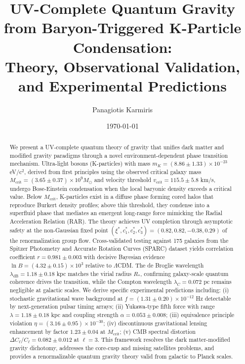 \documentclass[aps,prd,twocolumn,showpacs,superscriptaddress,groupedaddress,nofootinbib]{revtex4-2}
\begin{document}
\title{UV-Complete Quantum Gravity from Baryon-Triggered K-Particle Condensation: \\
Theory, Observational Validation, and Experimental Predictions}

\author{Panagiotis Karmiris}

\date{\today}

\begin{abstract}
We present a UV-complete quantum theory of gravity that unifies dark matter and modified gravity paradigms through a novel environment-dependent phase transition mechanism. Ultra-light bosons (K-particles) with mass $m_K = (8.86 \pm 1.33) \times 10^{-23}$ eV/c$^2$, derived from first principles using the observed critical galaxy mass $M_{\text{crit}} = (3.65 \pm 0.37) \times 10^9 M_{\odot}$ and velocity threshold $v_{\text{crit}} = 115.5 \pm 5.8$ km/s, undergo Bose-Einstein condensation when the local baryonic density exceeds a critical value. Below $M_{\text{crit}}$, K-particles exist in a diffuse phase forming cored halos that reproduce Burkert density profiles; above this threshold, they condense into a superfluid phase that mediates an emergent long-range force mimicking the Radial Acceleration Relation (RAR). The theory achieves UV completion through asymptotic safety at the non-Gaussian fixed point $(\xi^*, c_1^*, c_2^*, c_3^*) = (0.82, 0.82, -0.38, 0.29)$ of the renormalization group flow. Cross-validated testing against 175 galaxies from the Spitzer Photometry and Accurate Rotation Curves (SPARC) dataset yields correlation coefficient $r = 0.981 \pm 0.003$ with decisive Bayesian evidence $\ln B = (4.32 \pm 0.15) \times 10^3$ relative to $\Lambda$CDM. The de Broglie wavelength $\lambda_{\text{dB}} = 1.18 \pm 0.18$ kpc matches the virial radius $R_*$, confirming galaxy-scale quantum coherence drives the transition, while the Compton wavelength $\lambda_C = 0.072$ pc remains negligible at galactic scales. We derive specific experimental predictions including: (i) stochastic gravitational wave background at $f = (1.31 \pm 0.20) \times 10^{-12}$ Hz detectable by next-generation pulsar timing arrays; (ii) Yukawa-type fifth force with range $\lambda = 1.18 \pm 0.18$ kpc and coupling strength $\alpha = 0.053 \pm 0.008$; (iii) equivalence principle violation $\eta = (3.16 \pm 0.95) \times 10^{-30}$; (iv) discontinuous gravitational lensing enhancement by factor $1.23 \pm 0.04$ at $M_{\text{crit}}$; (v) CMB spectral distortion $\Delta C_\ell/C_\ell = 0.082 \pm 0.012$ at $\ell = 3$. This framework resolves the dark matter-modified gravity dichotomy, addresses the core-cusp and missing satellites problems, and provides a renormalizable quantum gravity theory valid from galactic to Planck scales.
\end{abstract}
\end{document}
